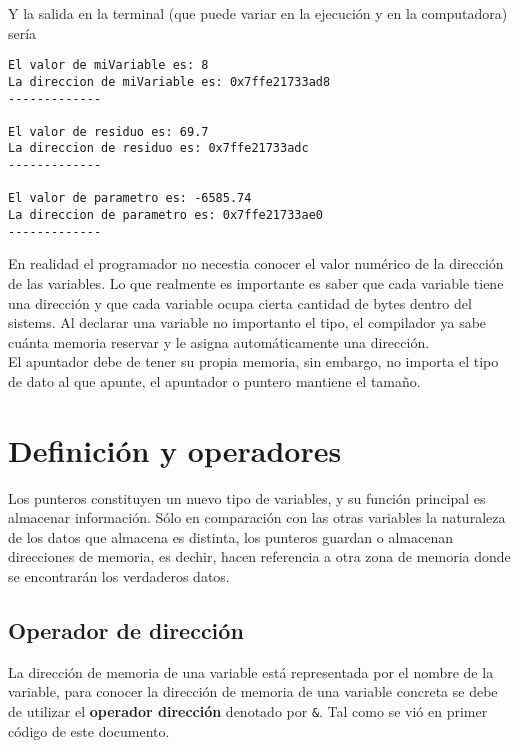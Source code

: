 \documentclass[12pt]{extarticle}
\newcommand{\<}{\langle}
\renewcommand{\>}{\rangle}
\theoremstyle{definition}
\begin{document}
Y la salida en la terminal (que puede variar en la ejecución y en la computadora) sería 

\begin{lstlisting}[caption={Obtención de la dirección de una variable - Salida en terminal},captionpos=b]
El valor de miVariable es: 8
La direccion de miVariable es: 0x7ffe21733ad8
-------------

El valor de residuo es: 69.7
La direccion de residuo es: 0x7ffe21733adc
-------------

El valor de parametro es: -6585.74
La direccion de parametro es: 0x7ffe21733ae0
-------------
\end{lstlisting}

En realidad el programador no necestia conocer el valor numérico de la dirección de las variables. Lo que realmente es importante es saber que cada variable tiene una dirección y que cada variable ocupa cierta cantidad de bytes dentro del sistems. Al declarar una variable no importanto el tipo, el compilador ya sabe cuánta memoria reservar y le asigna automáticamente una dirección. \\

El apuntador debe de tener su propia memoria, sin embargo, no importa el tipo de dato al que apunte, el apuntador o puntero mantiene el tamaño.\\

\section{Definición y operadores}
Los punteros constituyen un nuevo tipo de variables, y su función principal es almacenar información. Sólo en comparación con las otras variables la naturaleza de los datos que almacena es distinta, los punteros guardan o almacenan direcciones de memoria, es dechir, hacen referencia a otra zona de memoria donde se encontrarán los verdaderos datos.\\

\subsection{Operador de dirección}

La dirección de memoria de una variable está representada por el nombre de la variable, para conocer la dirección de memoria de una variable concreta se debe de utilizar el \textbf{operador dirección} denotado por \verb|&|. Tal como se vió en primer código de este documento.\\
\end{document}
